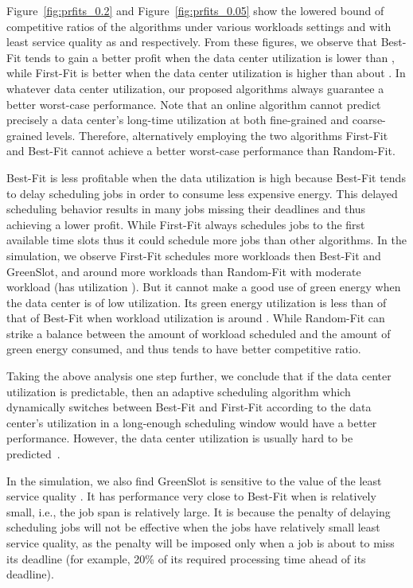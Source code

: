 \documentclass[conference]{IEEEtran}
\begin{document}
Figure~\ref{fig:prfits_0.2} and Figure~\ref{fig:prfits_0.05} show the lowered bound of competitive ratios of the algorithms under various workloads settings and with least service quality  as  and  respectively. From these figures, we observe that Best-Fit tends to gain a better profit when the data center utilization is lower than , while First-Fit is better when the data center utilization is higher than about . In whatever data center utilization, our proposed algorithms always guarantee a better worst-case performance. Note that an online algorithm cannot predict precisely a data center's long-time utilization at both fine-grained and coarse-grained levels. Therefore, alternatively employing the two algorithms First-Fit and Best-Fit cannot achieve a better worst-case performance than Random-Fit.

Best-Fit is less profitable when the data utilization is high because Best-Fit tends to delay scheduling jobs in order to consume less expensive energy. This delayed scheduling behavior results in many jobs missing their deadlines and thus achieving a lower profit. While First-Fit always schedules jobs to the first available time slots thus it could schedule more jobs than other algorithms. In the simulation, we observe First-Fit schedules  more workloads then Best-Fit and GreenSlot, and around  more workloads than Random-Fit with moderate workload (has utilization ). But it cannot make a good use of green energy when the data center is of low utilization. Its green energy utilization is less than  of that of Best-Fit when workload utilization is around . While Random-Fit can strike a balance between the amount of workload scheduled and the amount of green energy consumed, and thus tends to have better competitive ratio.

Taking the above analysis one step further, we conclude that if the data center utilization is predictable, then an adaptive scheduling algorithm which dynamically switches between Best-Fit and First-Fit according to the data center's utilization in a long-enough scheduling window would have a better performance. However, the data center utilization is usually hard to be predicted~\cite{MeisnerW10}.

In the simulation, we also find GreenSlot is sensitive to the value of the least service quality . It has performance very close to Best-Fit when  is relatively small, i.e., the job span is relatively large. It is because the penalty of delaying scheduling jobs will not be effective when the jobs have relatively small least service quality, as the penalty will be imposed only when a job is about to miss its deadline (for example, 20\% of its required processing time ahead of its deadline).
\end{document}
